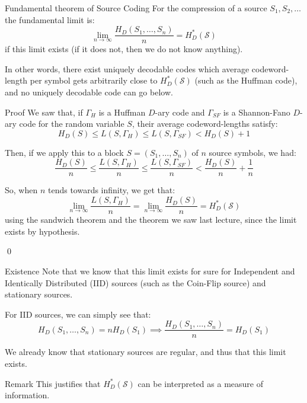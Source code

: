 \documentclass[a4paper]{article}
\begin{document}
\begin{parag}{Fundamental theorem of Source Coding}
    For the compression of a source $S_1, S_2, \ldots$ the fundamental limit is:
    \[\lim_{n \to \infty} \frac{H_D\left(S_1, \ldots, S_n\right)}{n} = H_D^*\left(\mathcal{S}\right)\]
    if this limit exists (if it does not, then we do not know anything).

    In other words, there exist uniquely decodable codes which average codeword-length per symbol gets arbitrarily close to $H^*_D\left(\mathcal{S}\right)$ (such as the Huffman code), and no uniquely decodable code can go below.

    \begin{subparag}{Proof}
        We saw that, if $\Gamma_H$ is a Huffman $D$-ary code and $\Gamma_{SF}$ is a Shannon-Fano $D$-ary code for the random variable $S$, their average codeword-lengths satisfy:
        \[H_D\left(S\right) \leq L\left(S, \Gamma_H\right) \leq L\left(S, \Gamma_{SF}\right) < H_D\left(S\right) + 1\]

        Then, if we apply this to a block $S = \left(S_1, \ldots, S_n\right)$ of $n$ source symbols, we had:
        \[\frac{H_D\left(S\right)}{n} \leq \frac{L\left(S, \Gamma_{H}\right)}{n} \leq \frac{L\left(S, \Gamma_{SF}\right)}{n} < \frac{H_D\left(S\right)}{n} + \frac{1}{n}\]

        So, when $n$ tends towards infinity, we get that:
        \[\lim_{n  \to \infty} \frac{L\left(S, \Gamma_{H}\right)}{n} = \lim_{n \to \infty} \frac{H_D\left(S\right)}{n} = H_D^*\left(\mathcal{S}\right)\]
        using the sandwich theorem and the theorem we saw last lecture, since the limit exists by hypothesis.

        \qed
    \end{subparag}


    \begin{subparag}{Existence}
        Note that we know that this limit exists for sure for Independent and Identically Distributed (IID) sources (such as the Coin-Flip source) and stationary sources.

        For IID sources, we can simply see that:
        \[H_D\left(S_1, \ldots, S_n\right) = nH_D\left(S_1\right) \implies \frac{H_D\left(S_1, \ldots, S_n\right)}{n} = H_D\left(S_1\right)\]

        We already know that stationary sources are regular, and thus that this limit exists.
    \end{subparag}

    \begin{subparag}{Remark}
        This justifies that $H_D^*\left(\mathcal{S}\right)$ can be interpreted as a measure of information.
    \end{subparag}
\end{parag}
\end{document}
